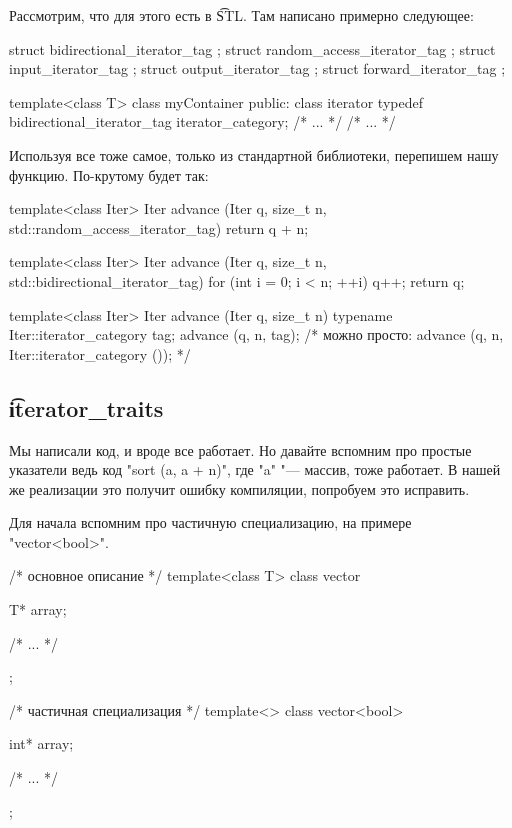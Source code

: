 Рассмотрим, что для этого есть в \t{STL}. 
Там написано примерно следующее:
\begin{cppcode}
struct bidirectional_iterator_tag {};
struct random_access_iterator_tag {};
struct input_iterator_tag {};
struct output_iterator_tag {};
struct forward_iterator_tag {};

template<class T> 
class myContainer {
public:
	class iterator {
		typedef bidirectional_iterator_tag iterator_category;
		/* ... */
	}
	/* ... */
}
\end{cppcode}

Используя все тоже самое, только из стандартной библиотеки, перепишем нашу функцию.
По-крутому будет так:
\begin{cppcode}
template<class Iter>
Iter advance (Iter q, size_t n, std::random_access_iterator_tag) {
	return q + n;
}

template<class Iter>
Iter advance (Iter q, size_t n, std::bidirectional_iterator_tag) {
	for (int i = 0; i < n; ++i)
		q++;
	return q;
} 

template<class Iter>
Iter advance (Iter q, size_t n) {
	typename Iter::iterator_category tag;
	advance (q, n, tag);
	/* можно просто: advance (q, n, Iter::iterator_category ()); */
}
\end{cppcode}

\subsection{\t{iterator\_traits}}
Мы написали код, и вроде все работает. 
Но давайте вспомним про простые указатели ведь код \cpp"sort (a, a + n)", где \cpp"a" "--- массив, тоже работает. 
В нашей же реализации это получит ошибку компиляции, попробуем это исправить.

Для начала вспомним про частичную специализацию, на примере \cpp"vector<bool>".
\begin{cppcode}
/* основное описание */
template<class T>
class vector {
	T* array;

	/* ... */
};

/* частичная специализация */
template<>
class vector<bool> {
	int* array;

	/* ... */
};
\end{cppcode}



